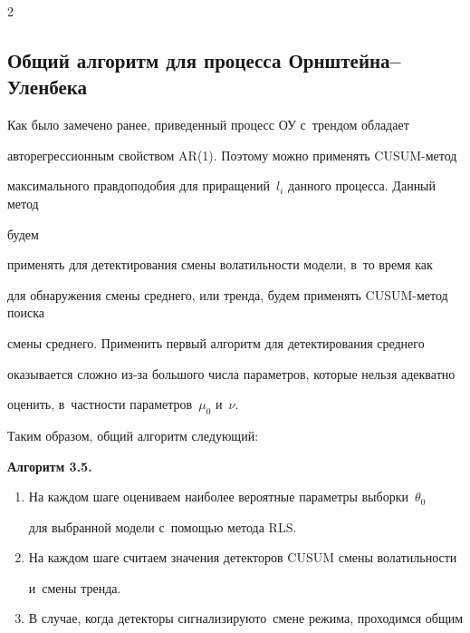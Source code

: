\begin{multicols}{2}
\subsection{Общий алгоритм для процесса Орнштейна--Уленбека}





Как было замечено ранее, приведенный процесс ОУ с~трендом обладает 


авторегрессионным свойством AR(1). Поэтому можно применять CUSUM-ме\-тод 


максимального правдоподобия для приращений~$l_i$ данного процесса. Данный метод 


будем\linebreak


 применять для детектирования смены во\-ла\-тиль\-ности модели, в~то время как 


для обнаружения смены среднего, или тренда, будем применять CUSUM-ме\-тод поиска 


смены среднего. Применить первый алгоритм для детектирования среднего 


оказывается сложно из-за большого числа параметров, которые нельзя адекватно 


оценить, в~частности па\-ра\-мет\-ров~$\mu_0$ и~$\nu$.





Таким образом, общий алгоритм следующий:





\smallskip





\noindent


\textbf{Алгоритм 3.5.} %





\noindent


\begin{enumerate}[1.]


\item На каждом шаге оцениваем наиболее вероятные параметры выборки~$\theta_0$ 


для выбранной модели с~помощью метода RLS.


\item На каждом шаге считаем значения детекторов CUSUM смены волатильности 


и~смены тренда.


\item В случае, когда детекторы сигнализируют\linebreak о~смене режима, проходимся общим 



\end{enumerate}
\end{multicols}
